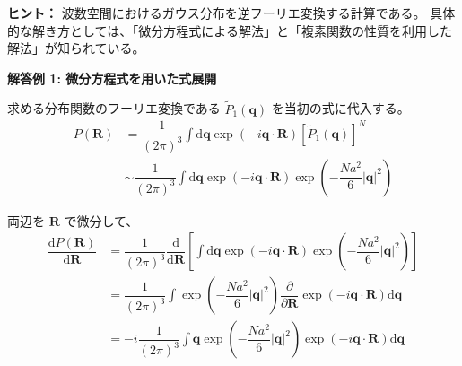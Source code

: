 \documentclass[uplatex,dvipdfmx,a4paper,11pt]{jsarticle}
\newcommand{\diff}{\mathrm d}
\newcommand{\difd}[2]{\dfrac{\diff #1}{\diff #2}}
\newcommand{\difp}[2]{\dfrac{\partial #1}{\partial #2}}
\begin{document}
\begin{enumerate}

\begin{itembox}[l]{{\bf ヒント：}}
波数空間におけるガウス分布を逆フーリエ変換する計算である。
具体的な解き方としては、「微分方程式による解法」と「複素関数の性質を利用した解法」が知られている。
\end{itembox}

{\bf 解答例 1: 微分方程式を用いた式展開}


求める分布関数のフーリエ変換である $\tilde{P}_1 (\bm{q}) $ を当初の式に代入する。
\begin{align*}
P(\bm{R}) 
	&= \dfrac{1}{(2 \pi)^3} \int \diff \bm{q} \exp \left( -i \bm{q} \cdot \bm{R} \right) \left[\tilde{P}_1 (\bm{q}) \right]^N \\
	&\sim \dfrac{1}{(2 \pi)^3} \int \diff \bm{q} \exp \left( -i \bm{q} \cdot \bm{R} \right) \exp \left( - \dfrac{Na^2}{6} |\bm{q}|^2 \right)
\end{align*}

両辺を $\bm{R}$ で微分して、
\begin{align*}
\dfrac{ \diff P(\bm{R})}{\diff \bm{R}} 
	&=\dfrac{1}{(2 \pi)^3} \difd{}{\bm{R}} \left[ \int \diff \bm{q} \exp \left( -i \bm{q} \cdot \bm{R} \right) \exp \left( - \dfrac{Na^2}{6} |\bm{q}|^2 \right) \right] \\
	&=\dfrac{1}{(2 \pi)^3} \int \exp \left( - \dfrac{Na^2}{6} |\bm{q}|^2 \right) \difp{}{\bm{R}} \exp \left( -i \bm{q} \cdot \bm{R} \right) \diff \bm{q} \\
	&= -i \dfrac{1}{(2 \pi)^3} \int \bm{q} \exp \left( - \dfrac{Na^2}{6} |\bm{q}|^2 \right) \exp \left( -i \bm{q} \cdot \bm{R} \right) \diff \bm{q}
\end{align*}


\end{enumerate}
\end{document}
